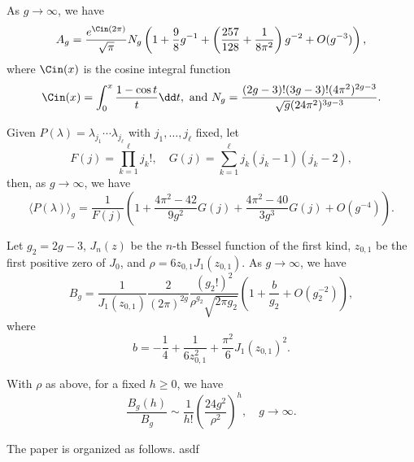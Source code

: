 \begin{thm}
\label{thm:lambda-one}
As $g\to \infty$, we have
\begin{equation}
A_g=\frac{e^{\Cin(2\pi)}}{\sqrt{\pi}}N_g
\left(1+\frac{9}{8}g^{-1}+\left(\frac{257}{128}+\frac{1}{8\pi^2}\right)g^{-2}+O(g^{-3})\right),
\label{eq:111}
\end{equation}
where $\Cin(x)$ is the cosine integral function
\[\Cin(x)=\int_0^x \frac{1-\cos t}{t}\dd t, \mbox{ and }
N_g=\frac{(2g-3)!(3g-3)!(4\pi^2)^{2g-3}}{\sqrt{g}(24\pi^2)^{3g-3}}.\]
\end{thm}

\begin{thm}
\label{thm:fixed-insertions}
Given $P(\lambda)=\lambda_{j_1}\cdots \lambda_{j_\ell}$ with $j_1, \dots, j_\ell$ fixed, let
\[F(j)=\prod_{k=1}^\ell j_k!, \quad G(j)=\sum_{k=1}^\ell j_k(j_k-1)(j_k-2),\]
then, as $g\to\infty$, we have
\begin{equation}
\langle P(\lambda) \rangle_g=\frac{1}{F(j)}\left(1+\frac{4\pi^2-42}{9g^2}G(j)+
\frac{4\pi^2-40}{3g^3}G(j)+O(g^{-4})\right).
\label{eq:P111}
\end{equation}
\end{thm}

\begin{thm}
\label{thm:top-hodge}
Let $g_2=2g-3$, $J_n(z)$ be the $n$-th Bessel function of the first kind, $z_{0,1}$ be the first
positive zero of $J_0$, and $\rho=6z_{0,1}J_1(z_{0,1})$.
As $g\to\infty$, we have
\begin{equation}
B_g=\frac{1}{J_1(z_{0,1})}\frac{2}{(2\pi)^{2g}}\frac{(g_2!)^2}{\rho^{g_2}\sqrt{2\pi g_2}}\left(
1+\frac{b}{g_2}+O(g_2^{-2})\right),
\label{eq:g111}
\end{equation}
where
\[b=-\frac{1}{4}+\frac{1}{6z_{0,1}^2}+\frac{\pi^2}{6}J_1(z_{0,1})^2.\]
\end{thm}

\begin{thm}
\label{thm:fixed-defect}
With $\rho$ as above, for a fixed $h \ge 0$, we have
\begin{equation}
\frac{B_g(h)}{B_g}\sim \frac{1}{h!}\left(\frac{24g^2}{\rho^2}\right)^h,\quad g\to\infty.
\label{eq:gh11}
\end{equation}
\end{thm}

The paper is organized as follows. asdf
